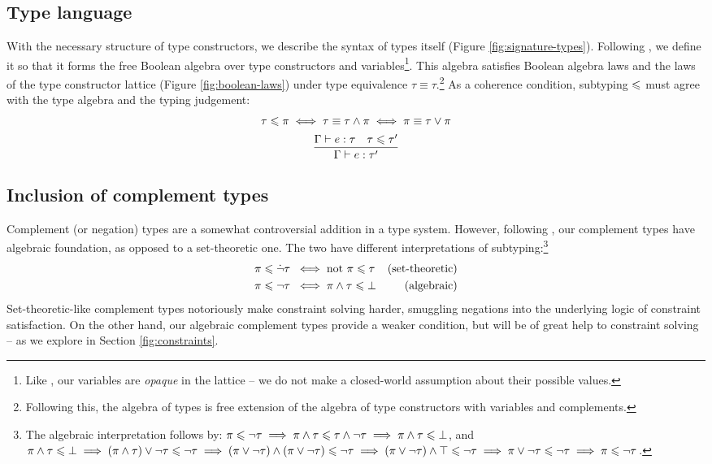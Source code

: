 \subsection{Type language}

With the necessary structure of type constructors, we describe the syntax of types itself (Figure \ref{fig:signature-types}). Following \textcite{mlstruct}, we define it so that it forms the free Boolean algebra over type constructors and variables\footnote{Like \textcite{dolan-thesis}, our variables are \emph{opaque} in the lattice -- we do not make a closed-world assumption about their possible values.}. This algebra satisfies Boolean algebra laws and the laws of the type constructor lattice (Figure \ref{fig:boolean-laws}) under type equivalence $\tau \equiv \tau$.\footnote{Following this, the algebra of types is free extension of the algebra of type constructors with variables and complements.} As a coherence condition, subtyping $\leqslant$ must agree with the type algebra and the typing judgement:
$$ \begin{array}{c}
   \tau \leqslant \pi \iff \tau \equiv \tau \land \pi \iff \pi \equiv \tau \lor \pi \\[5pt]
   \dfrac{\Gamma \vdash e : \tau \quad \tau \leqslant \tau'}{\Gamma \vdash e : \tau'}
\end{array} $$

\subsection{Inclusion of complement types} 
\label{subsec:oh-god-complements}
Complement (or negation) types are a somewhat controversial addition in a type system. However, following \textcite{mlstruct}, our complement types have algebraic foundation, as opposed to a set-theoretic one. The two have different interpretations of subtyping:\footnote{The algebraic interpretation follows by: $\pi \leqslant \lnot \tau \implies \pi \land \tau \leqslant \tau \land \lnot \tau \implies \pi \land \tau \leqslant \bot$, and $\pi \land \tau \leqslant \bot \implies (\pi \land \tau) \lor \lnot \tau \leqslant \lnot \tau \implies (\pi \lor \lnot \tau) \land (\pi \lor \lnot \tau) \leqslant \lnot \tau \implies (\pi \lor \lnot \tau) \land \top \leqslant \lnot \tau \implies \pi \lor \lnot \tau \leqslant \lnot \tau \implies \pi \leqslant \lnot \tau$.}
\begin{align*}
    \pi \leqslant \dot {\lnot} \tau \;&\iff \text{not } \pi \leqslant \tau & \text{(set-theoretic)} \\
    \pi \leqslant \lnot \tau \;&\iff \pi \land \tau \leqslant \bot & \text{(algebraic)} 
\end{align*}
Set-theoretic-like complement types notoriously make constraint solving harder, smuggling negations into the underlying logic of constraint satisfaction. On the other hand, our algebraic complement types provide a weaker condition, but will be of great help to constraint solving -- as we explore in Section \ref{fig:constraints}.

